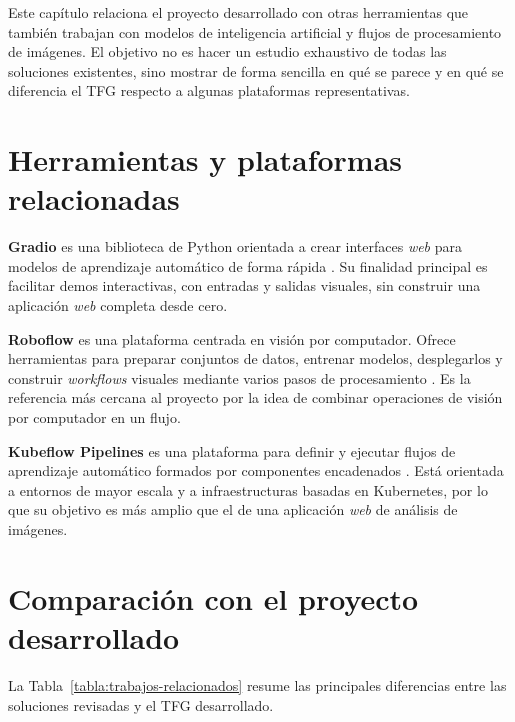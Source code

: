 
Este capítulo relaciona el proyecto desarrollado con otras herramientas que también trabajan con modelos de inteligencia artificial y flujos de procesamiento de imágenes. El objetivo no es hacer un estudio exhaustivo de todas las soluciones existentes, sino mostrar de forma sencilla en qué se parece y en qué se diferencia el TFG respecto a algunas plataformas representativas.


\section{Herramientas y plataformas relacionadas}

\textbf{Gradio} es una biblioteca de Python orientada a crear interfaces \textit{web} para modelos de aprendizaje automático de forma rápida \cite{gradio_docs}. Su finalidad principal es facilitar demos interactivas, con entradas y salidas visuales, sin construir una aplicación \textit{web} completa desde cero.

\textbf{Roboflow} es una plataforma centrada en visión por computador. Ofrece herramientas para preparar conjuntos de datos, entrenar modelos, desplegarlos y construir \textit{workflows} visuales mediante varios pasos de procesamiento \cite{roboflow_workflows_docs}. Es la referencia más cercana al proyecto por la idea de combinar operaciones de visión por computador en un flujo.

\textbf{Kubeflow Pipelines} es una plataforma para definir y ejecutar flujos de aprendizaje automático formados por componentes encadenados \cite{kubeflow_pipelines_docs}. Está orientada a entornos de mayor escala y a infraestructuras basadas en Kubernetes, por lo que su objetivo es más amplio que el de una aplicación \textit{web} de análisis de imágenes.

\section{Comparación con el proyecto desarrollado}

La Tabla~\ref{tabla:trabajos-relacionados} resume las principales diferencias entre las soluciones revisadas y el TFG desarrollado.


